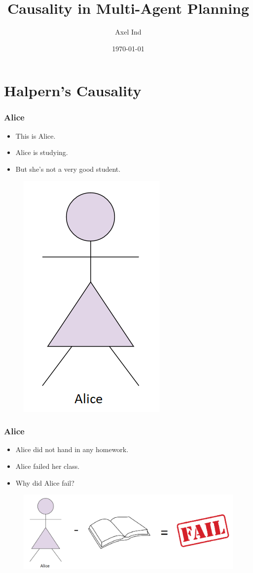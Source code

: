 \documentclass{beamer}
\title{Causality in Multi-Agent Planning}
\author{Axel Ind}
\institute{ALU-Freiburg}
\date{\today}
\theoremstyle{plain}
\theoremstyle{definition}
\begin{document}
 
\frame{\titlepage}

\section{Halpern's Causality}

\begin{frame}
\frametitle{Alice}
\begin{itemize}
\item This is Alice.
\item Alice is studying.
\item But she's not a very good student.
\end{itemize}

\begin{figure}
\includegraphics[scale=0.5]{alice}
\end{figure}

\end{frame}



\begin{frame}
\frametitle{Alice}
\begin{itemize}
\item Alice did not hand in any homework.
\item Alice failed her class.
\item Why did Alice fail?
\end{itemize}

\begin{figure}
\includegraphics[scale=0.3]{aliceFail}
\end{figure}

\end{frame}
\end{document}
